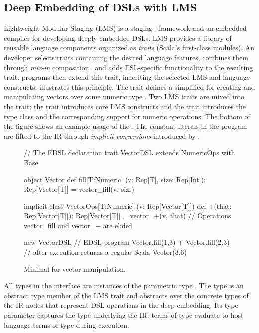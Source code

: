 \subsection{Deep Embedding of DSLs with LMS}
\label{subsec:deep-embedding}

Lightweight Modular Staging (LMS) is a
staging~\cite{taha_multi-stage_1997} framework and an embedded
compiler for developing deeply embedded DSLs.  LMS provides a library
of reusable language components organized as \emph{traits} (Scala's
first-class modules).  An \edsl developer selects traits containing
the desired language features, combines them through \emph{mix-in}
composition~\cite{odersky_scalable_2005} and adds DSL-specific
functionality to the resulting \edsl trait.  \edsl programs then
extend this trait, inheriting the selected LMS and \edsl language
constructs.  illustrates this principle.  The trait
 defines a simplified \edsl for creating and
manipulating vectors over some numeric type .  Two LMS traits
are mixed into the  trait: the  trait
introduces core LMS constructs %
and the  trait introduces the  type
class and the corresponding support for numeric operations.  The
bottom of the figure shows an example usage of the \edsl. The constant
literals in the program are lifted to the IR through \emph{implicit
  conversions} introduced by .

\begin{figure}
\begin{listingtiny}
// The EDSL declaration
trait VectorDSL extends NumericOps with Base {
  object Vector {
    def fill[T:Numeric]
      (v: Rep[T], size: Rep[Int]): Rep[Vector[T]] =
      vector_fill(v, size)
  }

  implicit class VectorOps[T:Numeric]
    (v: Rep[Vector[T]]) {
    def +(that: Rep[Vector[T]]): Rep[Vector[T]] =
      vector_+(v, that)
  }
  // Operations vector_fill and vector_+ are elided
}

new VectorDSL { // EDSL program
  Vector.fill(1,3) + Vector.fill(2,3)
} // after execution returns a regular Scala Vector(3,6)
\end{listingtiny}
\caption{\label{lst:lms} Minimal \edsl for vector manipulation.}
\end{figure}

All types in the  interface are instances of the
parametric type .  The  type is an abstract
type member of the  LMS trait and abstracts over the
concrete types of the IR nodes that represent DSL operations in the
deep embedding.  Its type parameter captures the type underlying the
IR: \edsl terms of type  evaluate to host language terms
of type  during \edsl execution.

